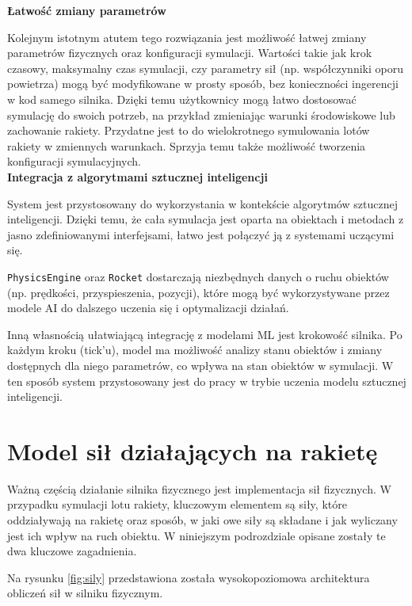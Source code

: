 \textbf{Łatwość zmiany parametrów}

Kolejnym istotnym atutem tego rozwiązania jest możliwość łatwej zmiany
parametrów fizycznych oraz konfiguracji symulacji. Wartości takie jak krok
czasowy, maksymalny czas symulacji, czy parametry sił (np. współczynniki
oporu powietrza) mogą być modyfikowane w prosty sposób, bez konieczności
ingerencji w kod samego silnika. Dzięki temu użytkownicy mogą łatwo
dostosować symulację do swoich potrzeb, na przykład zmieniając warunki
środowiskowe lub zachowanie rakiety. Przydatne jest to do wielokrotnego
symulowania lotów rakiety w zmiennych warunkach. Sprzyja temu także
możliwość tworzenia konfiguracji symulacyjnych.\\

\textbf{Integracja z algorytmami sztucznej inteligencji}

System jest przystosowany do wykorzystania w kontekście algorytmów sztucznej inteligencji. Dzięki temu, że cała symulacja jest oparta na obiektach i metodach z jasno zdefiniowanymi interfejsami, łatwo jest połączyć ją z systemami uczącymi się.

\texttt{PhysicsEngine} oraz \texttt{Rocket} dostarczają niezbędnych danych o ruchu obiektów (np. prędkości, przyspieszenia, pozycji), które mogą być wykorzystywane przez modele AI do dalszego uczenia się i optymalizacji działań.

Inną własnością ułatwiającą integrację z modelami ML jest krokowość
silnika. Po każdym kroku (tick'u), model ma możliwość analizy stanu obiektów
i zmiany dostępnych dla niego parametrów, co wpływa na stan obiektów w
symulacji. W ten sposób system przystosowany jest do pracy w trybie uczenia
modelu sztucznej inteligencji.


\section{Model sił działających na rakietę}\label{sec:model-si-dziaajacych-na-rakiete.}

Ważną częścią działanie silnika fizycznego jest implementacja sił
fizycznych. W przypadku symulacji lotu rakiety, kluczowym elementem są siły,
które oddziaływają na rakietę oraz sposób, w jaki owe siły są składane i jak
wyliczany jest ich wpływ na ruch obiektu. W niniejszym podrozdziale opisane
zostały te dwa kluczowe zagadnienia.

Na rysunku \ref{fig:sily} przedstawiona
została wysokopoziomowa architektura obliczeń sił w silniku fizycznym.

